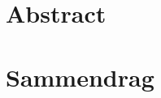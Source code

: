 \par\break\null%
\vsize%
{\centering\section*{Abstract}}

\blindtext{}

\vfill%
{\centering\section*{Sammendrag}}

\blindtext{}

\vfill\break%

